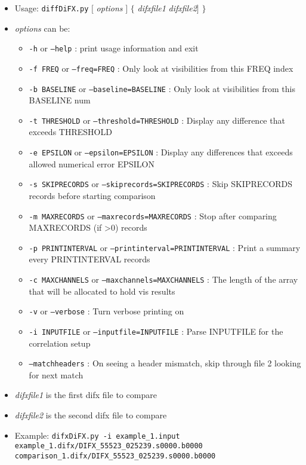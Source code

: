 \begin{itemize}
\item[] Usage: {\tt diffDiFX.py} $[$ {\em options} $]$ $\{$ {\em difxfile1} {\em difxfile2}$]$ $\}$
\item[] {\em options} can be:
\begin{itemize}
\item[] {\tt -h} or {\tt --help} : print usage information and exit
\item[] {\tt -f FREQ} or {\tt --freq=FREQ} : Only look at visibilities from this FREQ index
\item[] {\tt -b BASELINE} or {\tt --baseline=BASELINE} : Only look at visibilities from this BASELINE num
\item[] {\tt -t THRESHOLD} or {\tt --threshold=THRESHOLD} : Display any difference that exceeds THRESHOLD
\item[] {\tt -e EPSILON} or {\tt --epsilon=EPSILON} : Display any differences that exceeds allowed numerical error EPSILON
\item[] {\tt -s SKIPRECORDS} or {\tt --skiprecords=SKIPRECORDS} : Skip SKIPRECORDS records before starting comparison
\item[] {\tt -m MAXRECORDS} or {\tt --maxrecords=MAXRECORDS} : Stop after comparing MAXRECORDS (if >0) records
\item[] {\tt -p PRINTINTERVAL} or {\tt --printinterval=PRINTINTERVAL} : Print a summary every PRINTINTERVAL records
\item[] {\tt -c MAXCHANNELS} or {\tt --maxchannels=MAXCHANNELS} : The length of the array that will be allocated to hold vis results
\item[] {\tt -v} or {\tt --verbose} : Turn verbose printing on
\item[] {\tt -i INPUTFILE} or {\tt --inputfile=INPUTFILE} : Parse INPUTFILE for the correlation setup
\item[] {\tt --matchheaders} : On seeing a header mismatch, skip through file 2 looking for next match
\end{itemize}
\item[] {\em difxfile1} is the first difx file to compare
\item[] {\em difxfile2} is the second difx file to compare 
\item[] Example: {\tt difxDiFX.py -i example\_1.input example\_1.difx/DIFX\_55523\_025239.s0000.b0000} \\ {\tt comparison\_1.difx/DIFX\_55523\_025239.s0000.b0000}
\end{itemize}


